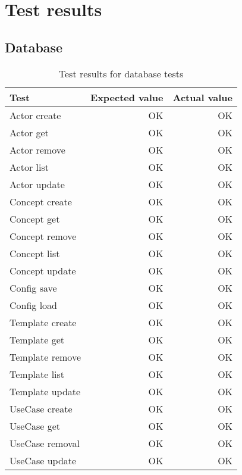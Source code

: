 \chapter{Test results}
\section{Database}
\begin{table}[!htbp]
\centering
\begin{tabular}{ | l | r | r | }
   \hline
   Test            & Expected value & Actual value \\ \hline
   Actor create    & OK             & OK           \\
   Actor get       & OK             & OK           \\
   Actor remove    & OK             & OK           \\
   Actor list      & OK             & OK           \\
   Actor update    & OK             & OK           \\
   Concept create  & OK             & OK           \\ 
   Concept get     & OK             & OK           \\
   Concept remove  & OK             & OK           \\
   Concept list    & OK             & OK           \\
   Concept update  & OK             & OK           \\
   Config save     & OK             & OK           \\
   Config load     & OK             & OK           \\
   Template create & OK             & OK           \\
   Template get    & OK             & OK           \\
   Template remove & OK             & OK           \\
   Template list   & OK             & OK           \\
   Template update & OK             & OK           \\
   UseCase create  & OK             & OK           \\
   UseCase get     & OK             & OK           \\
   UseCase removal & OK             & OK           \\
   UseCase update  & OK             & OK           \\
   \hline
\end{tabular}
\caption{Test results for database tests}
\label{tab:test-results-database}
\end{table}